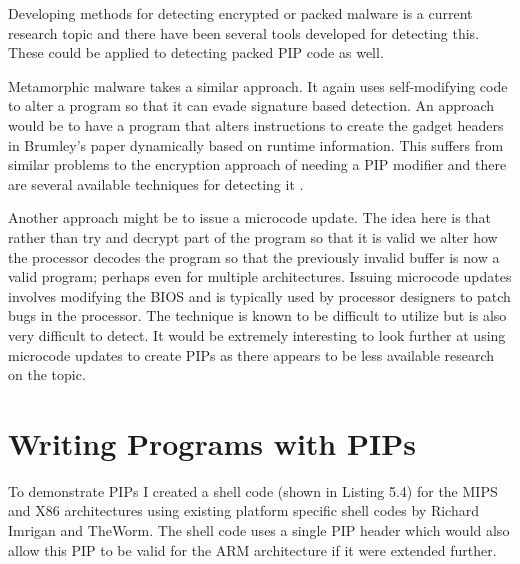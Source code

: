 \documentclass[10pt,]{book}
\begin{document}
Developing methods for detecting encrypted or packed malware is a
current research topic and there have been several tools developed for
detecting this\autocite{Chouchane:2006cf}\autocite{Zhang:2007jy}. These
could be applied to detecting packed PIP code as well.

Metamorphic malware\autocite{Sikorski:2011ua} takes a similar approach.
It again uses self-modifying code to alter a program so that it can
evade signature based detection. An approach would be to have a program
that alters instructions to create the gadget headers in Brumley's
paper\autocite{Cha:2010uh} dynamically based on runtime information.
This suffers from similar problems to the encryption approach of needing
a PIP modifier and there are several available techniques for detecting
it \autocite{Han:2011iu}\autocite{Ali:2011do}.

Another approach might be to issue a microcode
update\autocite{Smotherman:2010wr}. The idea here is that rather than
try and decrypt part of the program so that it is valid we alter how the
processor decodes the program so that the previously invalid buffer is
now a valid program; perhaps even for multiple architectures. Issuing
microcode updates involves modifying the BIOS and is typically used by
processor designers to patch bugs in the processor. The technique is
known to be difficult to utilize\autocite{Skoudis:2004to} but is also
very difficult to detect. It would be extremely interesting to look
further at using microcode updates to create PIPs as there appears to be
less available research on the topic.

\section{Writing Programs with PIPs}

To demonstrate PIPs I created a shell code (shown in Listing 5.4) for
the MIPS and X86 architectures using existing platform specific shell
codes by Richard Imrigan\autocite{Imrigan:vg} and
TheWorm\autocite{TheWorm:vp}. The shell code uses a single PIP header
which would also allow this PIP to be valid for the ARM architecture if
it were extended further.
\end{document}
